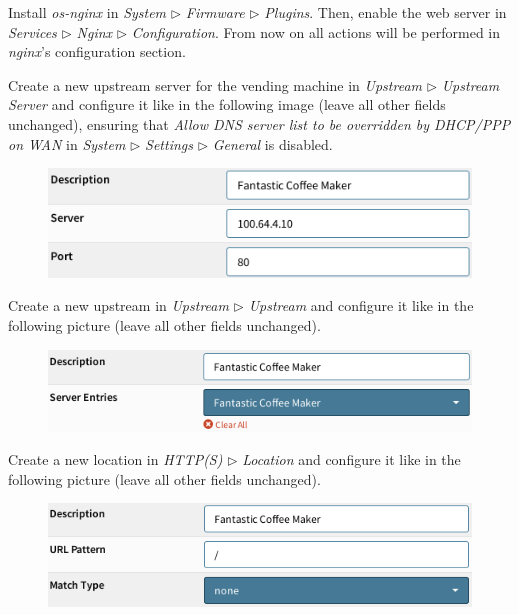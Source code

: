 \documentclass{homework}
\begin{document}
    Install \textit{os-nginx} in \textit{System} $\triangleright$ \textit{Firmware} $\triangleright$ \textit{Plugins}.
    Then, enable the web server in \textit{Services} $\triangleright$ \textit{Nginx} $\triangleright$ \textit{Configuration}.
    From now on all actions will be performed in \textit{nginx}'s configuration section.
    
    Create a new upstream server for the vending machine in \textit{Upstream} $\triangleright$ \textit{Upstream Server} and configure it like in the following image (leave all other fields unchanged), ensuring that \textit{Allow DNS server list to be overridden by DHCP/PPP on WAN } in \textit{System} $\triangleright$ \textit{Settings} $\triangleright$ \textit{General} is disabled.
    \vspace{-5pt}
    \begin{figure}[H]
        \centering
        \includegraphics[width=\linewidth]{images/upstream-server}
        \label{fig:upstream-server}
    \end{figure}
    \vspace{-20pt}
    
    Create a new upstream in \textit{Upstream} $\triangleright$ \textit{Upstream} and configure it like in the following picture (leave all other fields unchanged).
    \vspace{-5pt}
    \begin{figure}[H]
        \centering
        \includegraphics[width=1\linewidth]{images/upstream}
        \label{fig:upstream}
    \end{figure}
    \vspace{-20pt}
    
    Create a new location in \textit{HTTP(S)} $\triangleright$ \textit{Location} and configure it like in the following picture (leave all other fields unchanged).
    \vspace{-5pt}
    \begin{figure}[H]
        \centering
        \includegraphics[width=1\linewidth]{images/location}
        \label{fig:location}
    \end{figure}
    \vspace{-20pt}
    
\end{document}

